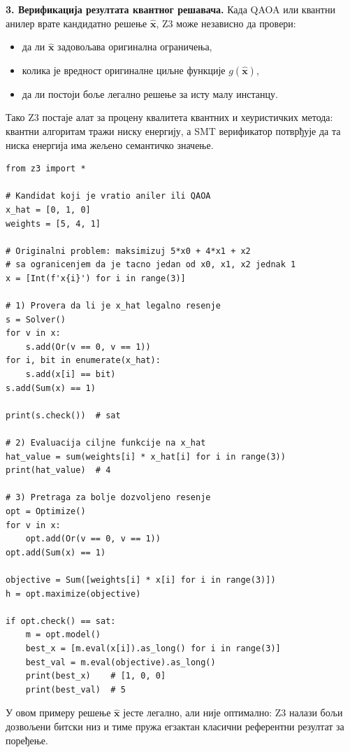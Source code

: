 \textbf{3. Верификација резултата квантног решавача.}
Када QAOA или квантни анилер врате кандидатно решење
$\hat{\mathbf{x}}$, Z3 може независно да провери:
\begin{itemize}[nosep]
  \item да ли $\hat{\mathbf{x}}$ задовољава оригинална ограничења,
  \item колика је вредност оригиналне циљне функције $g(\hat{\mathbf{x}})$,
  \item да ли постоји боље легално решење за исту малу инстанцу.
\end{itemize}
Тако Z3 постаје алат за процену квалитета
квантних и хеуристичких метода: квантни алгоритам тражи ниску
енергију, а SMT верификатор потврђује да та ниска енергија има
жељено семантичко значење.

\begin{example}
\begin{lstlisting}[style=python, caption={Z3 провера кандидатног решења добијеног квантним или хеуристичким решавачем.}]
from z3 import *

# Kandidat koji je vratio aniler ili QAOA
x_hat = [0, 1, 0]
weights = [5, 4, 1]

# Originalni problem: maksimizuj 5*x0 + 4*x1 + x2
# sa ogranicenjem da je tacno jedan od x0, x1, x2 jednak 1
x = [Int(f'x{i}') for i in range(3)]

# 1) Provera da li je x_hat legalno resenje
s = Solver()
for v in x:
    s.add(Or(v == 0, v == 1))
for i, bit in enumerate(x_hat):
    s.add(x[i] == bit)
s.add(Sum(x) == 1)

print(s.check())  # sat

# 2) Evaluacija ciljne funkcije na x_hat
hat_value = sum(weights[i] * x_hat[i] for i in range(3))
print(hat_value)  # 4

# 3) Pretraga za bolje dozvoljeno resenje
opt = Optimize()
for v in x:
    opt.add(Or(v == 0, v == 1))
opt.add(Sum(x) == 1)

objective = Sum([weights[i] * x[i] for i in range(3)])
h = opt.maximize(objective)

if opt.check() == sat:
    m = opt.model()
    best_x = [m.eval(x[i]).as_long() for i in range(3)]
    best_val = m.eval(objective).as_long()
    print(best_x)    # [1, 0, 0]
    print(best_val)  # 5
\end{lstlisting}
\end{example}

У овом примеру решење $\hat{\mathbf{x}}$ јесте легално, али није
оптимално: Z3 налази бољи дозвољени битски низ и тиме пружа егзактан
класични референтни резултат за поређење.

